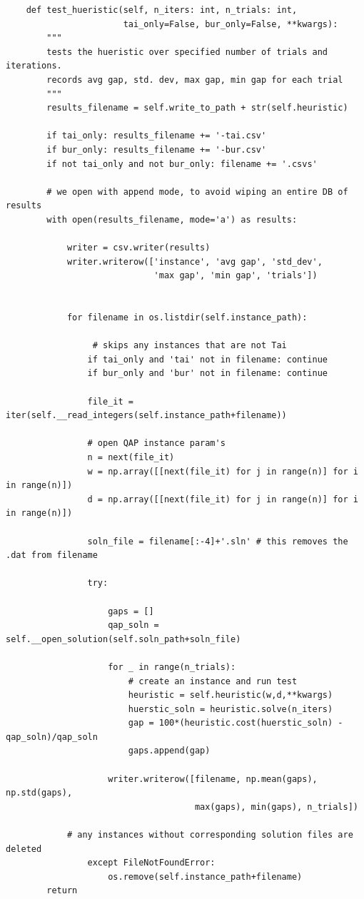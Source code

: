\documentclass[a4paper,10pt]{article}
\begin{document}
\begin{verbatim}
    def test_hueristic(self, n_iters: int, n_trials: int, 
                       tai_only=False, bur_only=False, **kwargs):
        """
        tests the hueristic over specified number of trials and iterations. 
        records avg gap, std. dev, max gap, min gap for each trial
        """
        results_filename = self.write_to_path + str(self.heuristic)

        if tai_only: results_filename += '-tai.csv'
        if bur_only: results_filename += '-bur.csv'
        if not tai_only and not bur_only: filename += '.csvs'

        # we open with append mode, to avoid wiping an entire DB of results
        with open(results_filename, mode='a') as results:  
            
            writer = csv.writer(results)
            writer.writerow(['instance', 'avg gap', 'std_dev', 
                             'max gap', 'min gap', 'trials'])


            for filename in os.listdir(self.instance_path): 
                
                 # skips any instances that are not Tai
                if tai_only and 'tai' not in filename: continue    
                if bur_only and 'bur' not in filename: continue

                file_it = iter(self.__read_integers(self.instance_path+filename))

                # open QAP instance param's 
                n = next(file_it)
                w = np.array([[next(file_it) for j in range(n)] for i in range(n)])
                d = np.array([[next(file_it) for j in range(n)] for i in range(n)])

                soln_file = filename[:-4]+'.sln' # this removes the .dat from filename

                try:
                    
                    gaps = []
                    qap_soln = self.__open_solution(self.soln_path+soln_file)

                    for _ in range(n_trials): 
                        # create an instance and run test
                        heuristic = self.heuristic(w,d,**kwargs)
                        huerstic_soln = heuristic.solve(n_iters)
                        gap = 100*(heuristic.cost(huerstic_soln) - qap_soln)/qap_soln
                        gaps.append(gap)

                    writer.writerow([filename, np.mean(gaps), np.std(gaps), 
                                     max(gaps), min(gaps), n_trials])
                
            # any instances without corresponding solution files are deleted
                except FileNotFoundError:
                    os.remove(self.instance_path+filename)        
        return
\end{verbatim}
\end{document}
